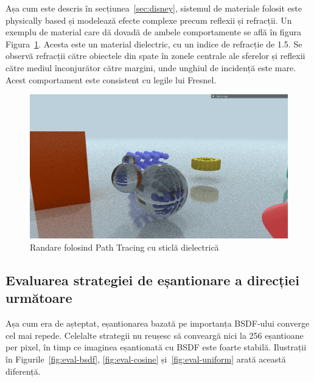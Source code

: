 \documentclass[12pt,a4paper]{report}
\numberwithin{equation}{section} %
\begin{document}
Așa cum este descris în secțiunea~\ref{sec:disney}, sistemul de materiale
folosit este physically based și modelează efecte complexe precum reflexii și
refracții. Un exemplu de material care dă dovadă de ambele comportamente se află
în figura Figura~\ref{fig:demo_refraction}. Acesta este un material dielectric, cu
un indice de refracție de 1.5. Se observă refracții către obiectele din spate
în zonele centrale ale sferelor și reflexii către mediul înconjurător către
margini, unde unghiul de incidență este mare. Acest comportament este consistent
cu legile lui Fresnel.
\begin{figure}[!htb]
	\centering
	\includegraphics[width=\textwidth]{pics/demo_refraction.png}
	\caption{Randare folosind Path Tracing cu sticlă dielectrică}
	\label{fig:demo_refraction}
\end{figure}

\subsection{Evaluarea strategiei de eșantionare a direcției următoare}

Așa cum era de așteptat, eșantionarea bazată pe importanța BSDF-ului converge cel mai repede.
Celelalte strategii nu reușesc să conveargă nici la 256 eșantioane per pixel, în timp ce
imaginea eșantionată cu BSDF este foarte stabilă. Ilustrații în Figurile~\ref{fig:eval-bsdf},
\ref{fig:eval-cosine} și~\ref{fig:eval-uniform} arată această diferență.
\end{document}
